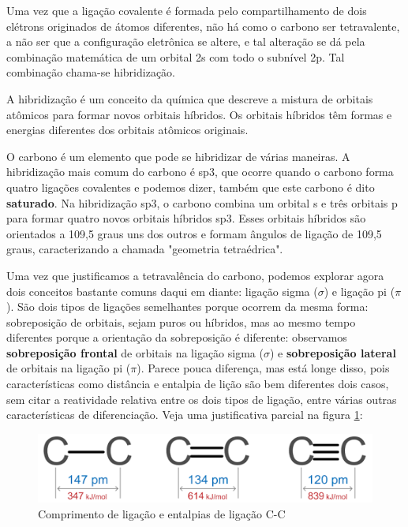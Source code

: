 \documentclass[a4paper,12pt]{book}
\begin{document}
Uma vez que a ligação covalente é formada pelo compartilhamento de dois elétrons originados de átomos diferentes, não há como o carbono ser tetravalente, a não ser que a configuração eletrônica se altere, e tal alteração se dá pela combinação matemática de um orbital 2s com todo o subnível 2p. Tal combinação chama-se hibridização.

A hibridização é um conceito da química que descreve a mistura de orbitais atômicos para formar novos orbitais híbridos. Os orbitais híbridos têm formas e energias diferentes dos orbitais atômicos originais.

O carbono é um elemento que pode se hibridizar de várias maneiras. A hibridização mais comum do carbono é sp3, que ocorre quando o carbono forma quatro ligações covalentes e podemos dizer, também que este carbono é dito  \textbf{saturado}. Na hibridização sp3, o carbono combina um orbital s e três orbitais p para formar quatro novos orbitais híbridos sp3. Esses orbitais híbridos são orientados a 109,5 graus uns dos outros e formam ângulos de ligação de 109,5 graus, caracterizando a chamada "geometria tetraédrica".

Uma vez que justificamos a tetravalência do carbono, podemos explorar agora dois conceitos bastante comuns daqui em diante: ligação sigma ($\sigma$) e ligação pi ($\pi$). São dois tipos de ligações semelhantes porque ocorrem da mesma forma: sobreposição de orbitais, sejam puros ou híbridos, mas ao mesmo tempo diferentes porque a orientação da sobreposição é diferente: observamos \textbf{sobreposição frontal} de orbitais na ligação sigma ($\sigma$) e \textbf{sobreposição lateral} de orbitais na ligação pi ($\pi$). Parece pouca diferença, mas está longe disso, pois características como distância e entalpia de lição são bem diferentes dois casos, sem citar a reatividade relativa entre os dois tipos de ligação, entre várias outras características de diferenciação. Veja uma justificativa parcial na figura \ref*{fig:sdt}:

\begin{figure}[h]
	\centering
	\caption{Comprimento de ligação e entalpias de ligação C-C}
	\vspace{0.25cm}
	\label{fig:sdt}
	\includegraphics[width=0.85\linewidth]{imagens/sdt.png}
\end{figure}
\end{document}
